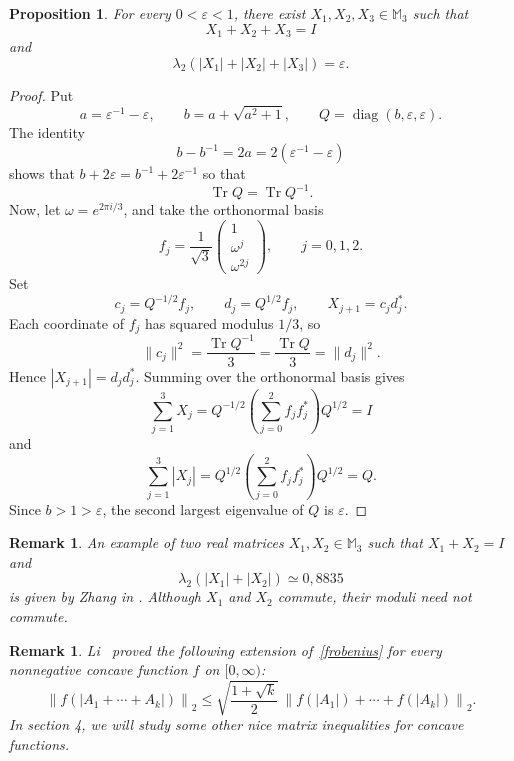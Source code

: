 \documentclass[11pt]{amsart}
\numberwithin{equation}{section}
\newtheorem{proposition}[theorem]{Proposition}
\newtheorem{remark}[theorem]{Remark}
\newcommand{\Tr}{\operatorname{Tr}}
\newcommand{\diag}{\operatorname{diag}}
\newcommand{\norm}[1]{\lVert #1\rVert}
\begin{document}
\begin{proposition}\label{prop:ordinary-zero}
For every $0<\varepsilon<1$, there exist $X_1,X_2,X_3\in\mathbb M_3$ such that
\[
 X_1+X_2+X_3=I
\]
and
\begin{equation*}
 \lambda_2\left(|X_1|+|X_2|+|X_3|\right)=\varepsilon.
\end{equation*}
\end{proposition}

\begin{proof}
Put
\[
 a=\varepsilon^{-1}-\varepsilon,
 \qquad
 b=a+\sqrt{a^2+1},
 \qquad
 Q=\diag(b,\varepsilon,\varepsilon).
\]
The identity
\[
 b-b^{-1}=2a=2(\varepsilon^{-1}-\varepsilon)
\]
shows that $b+2\varepsilon=b^{-1}+2\varepsilon^{-1}$ so that
 $$\Tr Q=\Tr Q^{-1}.$$
Now, let $\omega=e^{2\pi i/3}$, and take the orthonormal basis
\[
 f_j=\frac1{\sqrt3}
       \begin{pmatrix}1\\\omega^j\\\omega^{2j}\end{pmatrix},
 \qquad j=0,1,2.
\]
Set
\[
 c_j=Q^{-1/2}f_j,
 \qquad d_j=Q^{1/2}f_j,
 \qquad X_{j+1}=c_jd_j^*.
\]
Each coordinate of $f_j$ has squared modulus $1/3$, so
\[
 \norm{c_j}^2=\frac{\Tr Q^{-1}}3
             =\frac{\Tr Q}3=\norm{d_j}^2.
\]
Hence $|X_{j+1}|=d_jd_j^*$. Summing over the orthonormal basis gives
\[
 \sum_{j=1}^3X_j
 =Q^{-1/2}\left(\sum_{j=0}^2f_jf_j^*\right)Q^{1/2}=I
\]
and
\[
 \sum_{j=1}^3|X_j|
 =Q^{1/2}\left(\sum_{j=0}^2f_jf_j^*\right)Q^{1/2}=Q.
\]
Since $b>1>\varepsilon$, the second largest eigenvalue of $Q$ is $\varepsilon$.
\end{proof}


\begin{remark} An example of two real matrices $X_1,X_2\in\mathbb M_3$ such that $X_1+X_2=I$ and
$$
\lambda_2\left(|X_1|+|X_2|\right)\simeq 0,8835
$$
is given by Zhang in \cite{TZhang2026}. Although $X_1$ and $X_2$ commute, their moduli need not commute.
\end{remark}


\begin{remark} Li~\cite{Li26} proved the following extension of~\eqref{frobenius}
for every nonnegative concave function $f$ on $[0,\infty)$:
\begin{equation}\label{frobeniusconcave}
\left\| f\left( |A_1+\cdots + A_k|\right)\right\|_2 \le \sqrt{\frac{1+\sqrt{k}}{2}} \, \left\| f(|A_1|)+\cdots +f(|A_k|)\right\|_2.
\end{equation}
In section 4, we will study some other nice matrix inequalities for concave functions.
\end{remark} 
\end{document}
